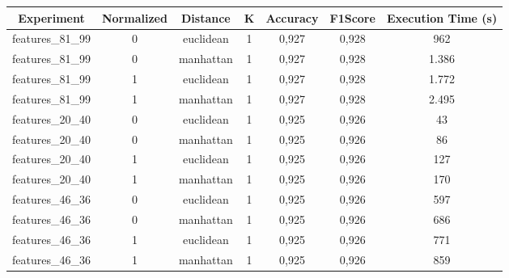 \documentclass[12pt]{article}
\begin{document}
\begin{table}[!htb]
  \centering
  \begin{tabular}{|c|c|c|c|c|c|c|}
  \hline
  \textbf{Experiment} & \textbf{Normalized} & \textbf{Distance} & \textbf{K} & \textbf{Accuracy} & \textbf{F1Score} & \textbf{Execution Time (s)} \\ \hline
  features\_81\_99    & 0                   & euclidean         & 1          & 0,927             & 0,928            & 962                     \\ \hline
  features\_81\_99    & 0                   & manhattan         & 1          & 0,927             & 0,928            & 1.386                   \\ \hline
  features\_81\_99    & 1                   & euclidean         & 1          & 0,927             & 0,928            & 1.772                   \\ \hline
  features\_81\_99    & 1                   & manhattan         & 1          & 0,927             & 0,928            & 2.495                   \\ \hline
  features\_20\_40    & 0                   & euclidean         & 1          & 0,925             & 0,926            & 43                      \\ \hline
  features\_20\_40    & 0                   & manhattan         & 1          & 0,925             & 0,926            & 86                      \\ \hline
  features\_20\_40    & 1                   & euclidean         & 1          & 0,925             & 0,926            & 127                     \\ \hline
  features\_20\_40    & 1                   & manhattan         & 1          & 0,925             & 0,926            & 170                     \\ \hline
  features\_46\_36    & 0                   & euclidean         & 1          & 0,925             & 0,926            & 597                     \\ \hline
  features\_46\_36    & 0                   & manhattan         & 1          & 0,925             & 0,926            & 686                     \\ \hline
  features\_46\_36    & 1                   & euclidean         & 1          & 0,925             & 0,926            & 771                     \\ \hline
  features\_46\_36    & 1                   & manhattan         & 1          & 0,925             & 0,926            & 859                     \\ \hline

\end{tabular}
\end{table}
\end{document}

